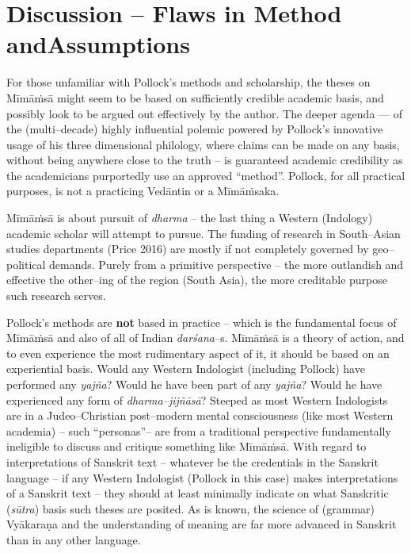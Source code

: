 \section*{Discussion – Flaws in Method and\hfill \break Assumptions}

\vskip -6pt

For those unfamiliar with Pollock’s methods and scholarship, the theses on Mīmāṁsā might seem to be based on sufficiently credible academic basis, and possibly look to be argued out effectively by the author. The deeper agenda — of the (multi–decade) highly influential polemic powered by Pollock’s innovative usage of his three dimensional philology, where claims can be made on any basis, without being anywhere close to the truth – is guaranteed academic credibility as the academicians purportedly use an approved “method”. Pollock, for all practical purposes, is not a practicing Vedāntin or a Mīmāṁsaka.

Mīmāṁsā is about pursuit of \textit{dharma} – the last thing a Western (Indology) academic scholar will attempt to pursue. The funding of research in South–Asian studies departments (Price 2016) are mostly if not completely governed by geo–political demands. Purely from a primitive perspective – the more outlandish and effective the other–ing of the region (South Asia), the more creditable purpose such research serves.

Pollock’s methods are \textbf{not} based in practice – which is the fundamental focus of Mīmāṁsā and also of all of Indian \textit{darśana–}s. Mīmāṁsā is a theory of action, and to even experience the most rudimentary aspect of it, it should be based on an experiential basis. Would any Western Indologist (including Pollock) have performed any \textit{yajña}? Would he have been part of any \textit{yajña}? Would he have experienced any form of \textit{dharma–jijñāsā}? Steeped as most Western Indologists are in a Judeo–Christian post–modern mental consciousness (like most Western academia) – such “personas”– are from a traditional perspective fundamentally ineligible to discuss and critique something like Mīmāṁsā. With regard to interpretations of Sanskrit text – whatever be the credentials in the Sanskrit language – if any Western Indologist (Pollock in this case) makes interpretations of a Sanskrit text – they should at least minimally indicate on what Sanskritic (\textit{sūtra}) basis such theses are posited. As is known, the science of (grammar) Vyākaraṇa and the understanding of meaning are far more advanced in Sanskrit than in any other language.

